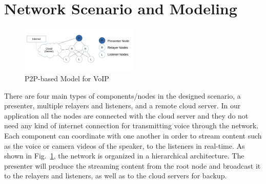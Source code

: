 \section{Network Scenario and Modeling}

\begin{figure}[h!]
  \centering
    \includegraphics[width=0.5\textwidth]{figures/model1_test2.jpg}
  \caption{P2P-based Model for VoIP}
  \label{fig:mod1}
\end{figure}
There are four main types of components/nodes in the designed scenario, a
presenter, multiple relayers and listeners, and a remote cloud server.
In our application all the nodes are connected with the cloud server and
they do not need any kind of internet connection for transmitting voice through the network.
Each component can coordinate with one another in order to stream content such
as the voice or camera videos of the speaker, to the listeners in real-time. As
shown in Fig.~\ref{fig:mod1}, the network is organized in a hierarchical
architecture. The presenter will produce the streaming content from the
root node and broadcast it to the relayers and listeners, as well as to
the cloud servers for backup.


